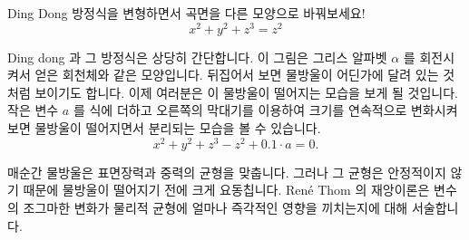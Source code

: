 \begin{surferPage}{Ding Dong}
방정식을 변형하면서 곡면을 다른 모양으로 바꿔보세요!\\

\smallskip
\[x^2	+ y^2	+ z^3	= z^2\]

\singlespacing
Ding dong 과 그 방정식은 상당히 간단합니다. 이 그림은 그리스 알파벳  $\alpha$ 를 회전시켜서 얻은 회천체와 같은 모양입니다. 뒤집어서 보면 물방울이 어딘가에 달려 있는 것처럼 보이기도 합니다. 이제 여러분은 이 물방울이 떨어지는 모습을 보게 될 것입니다. 
\newline
작은 변수 $a$ 를 식에 더하고 오른쪽의 막대기를 이용하여 크기를 연속적으로 변화시켜보면 물방울이 떨어지면서 분리되는 모습을 볼 수 있습니다.  
\[x^2	+ y^2	+ z^3	-z^2+0.1\cdot a=0.\]

매순간 물방울은 표면장력과 중력의 균형을 맞춥니다. 그러나 그 균형은 안정적이지 않기 때문에 물방울이 떨어지기 전에 크게 요동칩니다. Ren\'e Thom 의 재앙이론은 변수의 조그마한 변화가 물리적 균형에 얼마나 즉각적인 영향을 끼치는지에 대해 서술합니다. 
\end{surferPage}
